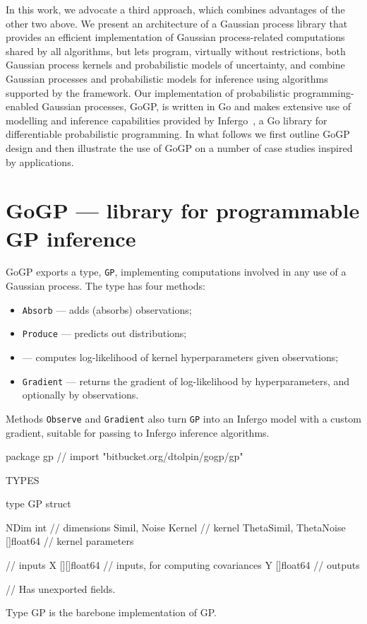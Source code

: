 \documentclass[sigplan,review]{acmart}\settopmatter{printfolios=true,printccs=false,printacmref=false}
\begin{document}
In this work, we advocate a third approach, which combines
advantages of the other two above. We present an architecture of
a Gaussian process library that provides an efficient
implementation of Gaussian process-related computations shared
by all algorithms, but lets program, virtually without
restrictions, both Gaussian process kernels and probabilistic
models of uncertainty, and combine Gaussian processes and
probabilistic models for inference using algorithms supported by
the framework. Our implementation of probabilistic
programming-enabled Gaussian processes, GoGP, is written in Go
and makes extensive use of modelling and inference capabilities
provided by Infergo~\cite{}, a Go library for differentiable
probabilistic programming. In what follows we first outline GoGP
design  and then illustrate the use of GoGP on a number of case
studies inspired by applications.

\section{GoGP --- library for programmable GP inference}

GoGP exports a type, \lstinline{GP}, implementing computations
involved in any use of a Gaussian process. The type has four
methods:

\begin{itemize}
	\item \lstinline{Absorb} --- adds (absorbs) observations;
	\item \lstinline{Produce} --- predicts out distributions;
	\item {} --- computes log-likelihood of
		kernel hyperparameters given observations;
	\item \lstinline{Gradient} --- returns the gradient of
		log-likelihood by hyperparameters, and optionally
		by observations.
\end{itemize}

Methods \lstinline{Observe} and \lstinline{Gradient} also turn
\lstinline{GP} into an Infergo model with a custom gradient,
suitable for passing to Infergo inference algorithms.


package gp // import "bitbucket.org/dtolpin/gogp/gp"


TYPES

type GP struct {
	NDim                   int       // dimensions
	Simil, Noise           Kernel    // kernel
	ThetaSimil, ThetaNoise []float64 // kernel parameters

	// inputs
	X [][]float64 // inputs, for computing covariances
	Y []float64   // outputs

	// Has unexported fields.
}
    Type GP is the barebone implementation of GP.
\end{document}
